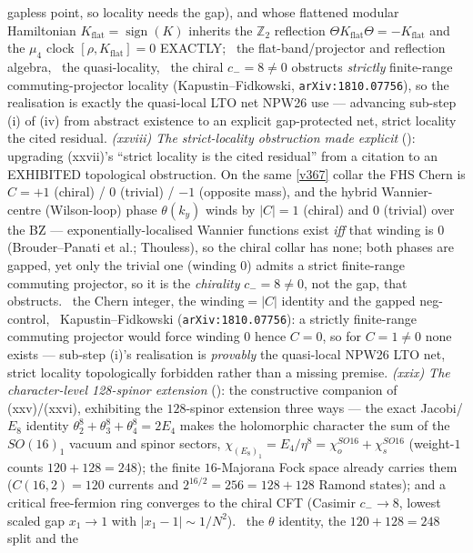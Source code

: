 \documentclass[11pt,a4paper]{article}
\newcommand{\Z}{\mathbb Z}
\begin{document}
\begin{keybox}
gapless point, so locality needs the gap), and whose flattened modular Hamiltonian $K_{\mathrm{flat}}{=}
\operatorname{sign}(K)$ inherits the $\Z_2$ reflection $\Theta K_{\mathrm{flat}}\Theta{=}{-}K_{\mathrm{flat}}$ and the
$\mu_4$ clock $[\rho,K_{\mathrm{flat}}]{=}0$ EXACTLY; \mE\ the flat-band/projector and reflection algebra, \mC\ the
quasi-locality, \mO\ the chiral $c_-{=}8{\neq}0$ obstructs \emph{strictly} finite-range commuting-projector locality
(Kapustin--Fidkowski, \texttt{arXiv:1810.07756}), so the realisation is exactly the quasi-local LTO net NPW26 use ---
advancing sub-step (i) of (iv) from abstract existence to an explicit gap-protected net, strict locality the cited
residual. \emph{(xxviii) The strict-locality obstruction made explicit} ():
upgrading (xxvii)'s ``strict locality is the cited residual'' from a citation to an EXHIBITED topological
obstruction. On the same \vref{v367} collar the FHS Chern is $C{=}{+}1$ (chiral) / $0$ (trivial) / $-1$
(opposite mass), and the hybrid Wannier-centre (Wilson-loop) phase $\theta(k_y)$ winds by $|C|{=}1$ (chiral) and
$0$ (trivial) over the BZ --- exponentially-localised Wannier functions exist \emph{iff} that winding is $0$
(Brouder--Panati et al.; Thouless), so the chiral collar has none; both phases are gapped, yet only the trivial one
(winding $0$) admits a strict finite-range commuting projector, so it is the \emph{chirality} $c_-{=}8{\neq}0$, not
the gap, that obstructs. \mE\ the Chern integer, the winding$={}|C|$ identity and the gapped neg-control, \mC\mO\
Kapustin--Fidkowski (\texttt{arXiv:1810.07756}): a strictly finite-range commuting projector would force winding
$0$ hence $C{=}0$, so for $C{=}1{\neq}0$ none exists --- sub-step (i)'s realisation is \emph{provably} the
quasi-local NPW26 LTO net, strict locality topologically forbidden rather than a missing premise. \emph{(xxix) The
character-level 128-spinor extension} (\veri{v462\_seam\_spinor\_continuum.py}): the constructive companion of
(xxv)/(xxvi), exhibiting the $128$-spinor extension three ways --- the exact Jacobi/$E_8$ identity
$\theta_2^8{+}\theta_3^8{+}\theta_4^8{=}2E_4$ makes the holomorphic character the sum of the $SO(16)_1$ vacuum and
spinor sectors, $\chi_{(E_8)_1}{=}E_4/\eta^8{=}\chi_o^{SO16}{+}\chi_s^{SO16}$ (weight-$1$ counts $120{+}128{=}248$);
the finite $16$-Majorana Fock space already carries them ($C(16,2){=}120$ currents and $2^{16/2}{=}256{=}128{+}128$
Ramond states); and a critical free-fermion ring converges to the chiral CFT (Casimir $c_-{\to}8$, lowest scaled
gap $x_1{\to}1$ with $|x_1{-}1|{\sim}1/N^2$). \mE\ the $\theta$ identity, the $120{+}128{=}248$ split and the

\end{keybox}
\end{document}
